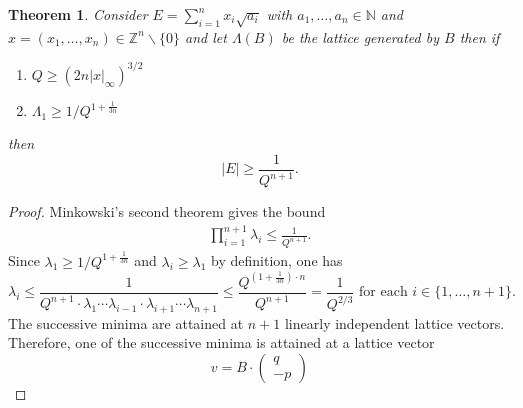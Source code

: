 \documentclass[a4paper,11pt,american]{article}
\newcommand{\N}{\mathbb{N}}
\newcommand{\Z}{\mathbb{Z}}
\theoremstyle{plain}
\newtheorem{theorem}{Theorem}
\theoremstyle{definition}
\begin{document}
\begin{theorem}
  \label{thr:4}
Consider $ E = \sum_{i=1}^n x_i \sqrt{a_i}$ with  
$a_1,\dots,a_n\in \N$  and $x = (x_1,\dots,x_n)\in\Z^n\backslash\{0\}$ and let $\Lambda(B)$ be the lattice generated by $B$ then if 
\begin{enumerate}
    \item $Q \geq \left(2 n \vert x\vert _\infty\right)^{3/2}$
    \item $\Lambda_1 \geq 1/Q^{1 + \frac{1}{3n}}$
\end{enumerate} then
  \begin{equation*}
    \vert E\vert  \geq \frac{1}{Q^{n+1}}. 
  \end{equation*}
\end{theorem}

\begin{proof}
  Minkowski's second theorem gives the bound 
  \begin{align}\label{eq:minkowski2}
    \prod_{i=1}^{n+1} \lambda_i \leq \frac{1}{Q^{n+1}}.
  \end{align}
 Since   $\lambda_1 \geq 1/Q^{1+\frac{1}{3n}}$ and $\lambda_i\geq \lambda_1$ by definition, one has 
\[ \lambda_{i}  \leq\frac{1}{Q^{n+1}\cdot\lambda_1\cdots\lambda_{i-1}\cdot\lambda_{i+1}\cdots\lambda_{n+1}}\leq\frac{Q^{(1+\frac{1}{3n})\cdot n}}{Q^{n+1}}=\frac{1}{Q^{2/3}} \text{  for each  } i \in\{1,\dots,n+1\}.\]
%
The successive minima are attained at  $n+1$ linearly independent lattice vectors. Therefore,  
one of the successive minima is attained at a lattice vector
\begin{displaymath}
  v =
B \cdot \begin{pmatrix} q \\ -p \end{pmatrix}
\end{displaymath}

\end{proof}
\end{document}
